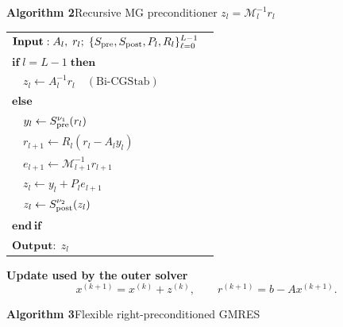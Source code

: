 \documentclass[border=7pt,12pt]{standalone}
\begin{document}
\begin{minipage}{30cm}
\renewcommand{\arraystretch}{1.25}
\begin{minipage}[t]{14.2cm}
\textbf{Algorithm 2}\quad Recursive MG preconditioner
\(z_l=\mathcal M_l^{-1}r_l\)

\begin{tabular}{@{}>{\raggedright\arraybackslash}p{0.96\linewidth}@{}}
\toprule
\(\mathbf{Input:}\; A_l,\;r_l;\;
 \{S_{\rm pre},S_{\rm post},P_l,R_l\}_{\ell=0}^{L-1}\)\\
\(\mathbf{if}\; l=L-1\;\mathbf{then}\)\\
\(\quad z_l\gets A_l^{-1}r_l\quad(\text{Bi-CGStab})\)\\
\(\mathbf{else}\)\\
\(\quad y_l\gets S_{\rm pre}^{\nu_1}(r_l)\)\\
\(\quad r_{l+1}\gets R_l\left(r_l-A_l y_l\right)\)\\
\(\quad e_{l+1}\gets\mathcal M_{l+1}^{-1}r_{l+1}\)\\
\(\quad z_l\gets y_l+P_l e_{l+1}\)\\
\(\quad z_l\gets S_{\rm post}^{\nu_2}(z_l)\)\\
\(\mathbf{end\,if}\)\\
\(\mathbf{Output:}\;z_l\)\\
\bottomrule
\end{tabular}

\vspace{0.75em}
\textbf{Update used by the outer solver}
\[
x^{(k+1)}=x^{(k)}+z^{(k)},\qquad
r^{(k+1)}=b-Ax^{(k+1)}.
\]
\end{minipage}
\hfill
\begin{minipage}[t]{14.2cm}
\textbf{Algorithm 3}\quad Flexible right-preconditioned GMRES


\end{minipage}
\end{minipage}
\end{document}

